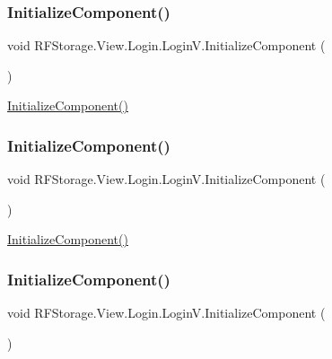 \subsubsection{\texorpdfstring{InitializeComponent()}{InitializeComponent()}\hspace{0.1cm}{\footnotesize\ttfamily [5/8]}}
{\footnotesize\ttfamily void R\+F\+Storage.\+View.\+Login.\+Login\+V.\+Initialize\+Component (\begin{DoxyParamCaption}{ }\end{DoxyParamCaption})}



\mbox{\hyperlink{class_r_f_storage_1_1_view_1_1_login_1_1_login_v_a538dafe420b2a8cba6fdf609380af5e8}{Initialize\+Component()}} 

\mbox{\label{class_r_f_storage_1_1_view_1_1_login_1_1_login_v_a538dafe420b2a8cba6fdf609380af5e8}} 
\subsubsection{\texorpdfstring{InitializeComponent()}{InitializeComponent()}\hspace{0.1cm}{\footnotesize\ttfamily [6/8]}}
{\footnotesize\ttfamily void R\+F\+Storage.\+View.\+Login.\+Login\+V.\+Initialize\+Component (\begin{DoxyParamCaption}{ }\end{DoxyParamCaption})}



\mbox{\hyperlink{class_r_f_storage_1_1_view_1_1_login_1_1_login_v_a538dafe420b2a8cba6fdf609380af5e8}{Initialize\+Component()}} 

\mbox{\label{class_r_f_storage_1_1_view_1_1_login_1_1_login_v_a538dafe420b2a8cba6fdf609380af5e8}} 
\subsubsection{\texorpdfstring{InitializeComponent()}{InitializeComponent()}\hspace{0.1cm}{\footnotesize\ttfamily [7/8]}}
{\footnotesize\ttfamily void R\+F\+Storage.\+View.\+Login.\+Login\+V.\+Initialize\+Component (\begin{DoxyParamCaption}{ }\end{DoxyParamCaption})}



